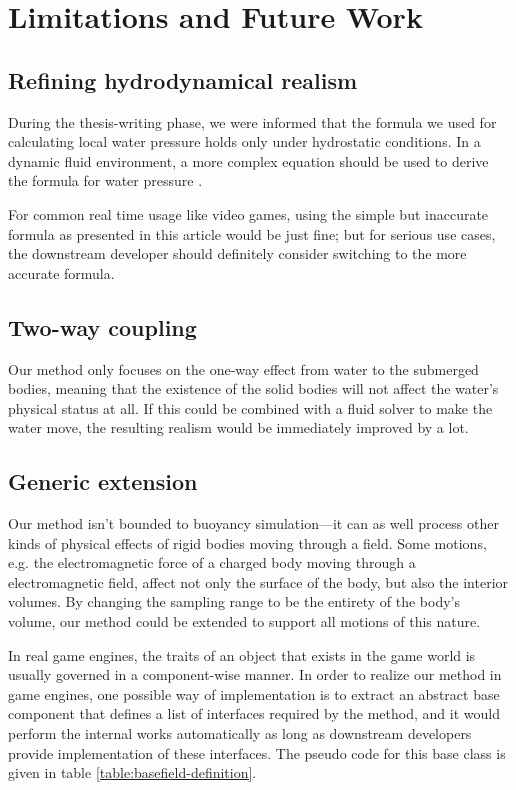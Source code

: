 \section{Limitations and Future Work}

\subsection{Refining hydrodynamical realism}

During the thesis-writing phase, we were informed that the formula we used for calculating local water pressure holds only under hydrostatic conditions.
In a dynamic fluid environment, a more complex equation should be used to derive the formula for water pressure \cite{national2003fundamentals}.

For common real time usage like video games, using the simple but inaccurate formula as presented in this article would be just fine; but for serious use cases, the downstream developer should definitely consider switching to the more accurate formula.

\subsection{Two-way coupling}

Our method only focuses on the one-way effect from water to the submerged bodies, meaning that the existence of the solid bodies will not affect the water's physical status at all.
If this could be combined with a fluid solver to make the water move, the resulting realism would be immediately improved by a lot.

\subsection{Generic extension}

Our method isn't bounded to buoyancy simulation---it can as well process other kinds of physical effects of rigid bodies moving through a field.
Some motions, e.g. the electromagnetic force of a charged body moving through a electromagnetic field, affect not only the surface of the body, but also the interior volumes.
By changing the sampling range to be the entirety of the body's volume, our method could be extended to support all motions of this nature.

In real game engines, the traits of an object that exists in the game world is usually governed in a component-wise manner.
In order to realize our method in game engines, one possible way of implementation is to extract an abstract base component that defines a list of interfaces required by the method, and it would perform the internal works automatically as long as downstream developers provide implementation of these interfaces.
The pseudo code for this base class is given in table \ref{table:basefield-definition}.

